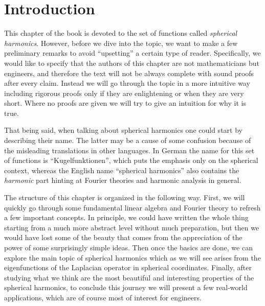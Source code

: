 
\section{Introduction}

This chapter of the book is devoted to the set of functions called
\emph{spherical harmonics}. However, before we dive into the topic, we want to
make a few preliminary remarks to avoid ``upsetting'' a certain type of
reader. Specifically, we would like to specify that the authors of this
chapter are not mathematicians but engineers, and therefore the text will not be
always complete with sound proofs after every claim. Instead we will go
through the topic in a more intuitive way including rigorous proofs only if
they are enlightening or when they are very short. Where no proofs are given
we will try to give an intuition for why it is true.

That being said, when talking about spherical harmonics one could start by
describing their name. The latter may be a cause of some confusion because of
the misleading translations in other languages. In German the name for this
set of functions is ``Kugelfunktionen'', which puts the emphasis only on the
spherical context, whereas the English name ``spherical harmonics'' also
contains the \emph{harmonic} part hinting at Fourier theories and harmonic
analysis in general.

The structure of this chapter is organized in the following way. First, we
will quickly go through some fundamental linear algebra and Fourier theory to
refresh a few important concepts. In principle, we could have written the
whole thing starting from a much more abstract level without much preparation,
but then we would have lost some of the beauty that comes from the
appreciation of the power of some surprisingly simple ideas. Then once the
basics are done, we can explore the main topic of spherical harmonics which as
we will see arises from the eigenfunctions of the Laplacian operator in
spherical coordinates. Finally, after studying what we think are the most
beautiful and interesting properties of the spherical harmonics, to conclude
this journey we will present a few real-world applications, which are of
course most of interest for engineers.

